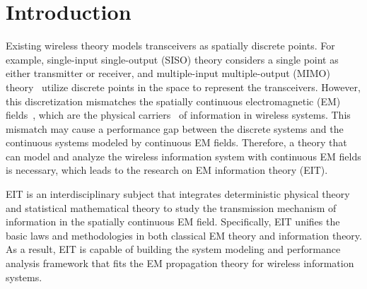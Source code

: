 \documentclass[journal,twocolumn]{IEEEtran}
\begin{document}
\section{Introduction}
Existing wireless theory models transceivers as spatially discrete points. For example, single-input single-output (SISO) theory considers a single point as either  transmitter or receiver, and multiple-input multiple-output (MIMO) theory~\cite{goldsmith2003capacity} utilize discrete points in the space to represent the transceivers. 
However, this discretization mismatches the spatially continuous electromagnetic (EM) fields~\cite{huang2020holographic}, which are the physical carriers~\cite{migliore2018horse} of information in wireless systems. 
This mismatch may cause a performance gap between the discrete systems and the continuous systems modeled by continuous EM fields. 
Therefore, a theory that can model and analyze the wireless information system with continuous EM fields is necessary, which leads to the research on EM information theory (EIT).

EIT is an interdisciplinary subject that integrates deterministic physical theory and statistical mathematical theory to study the transmission mechanism of information in the spatially continuous EM field. 
Specifically, EIT unifies the basic laws and methodologies in both classical EM theory and information theory. 
As a result, EIT is capable of building the system modeling and performance analysis framework that fits the EM propagation theory for wireless information systems. 
\end{document}
